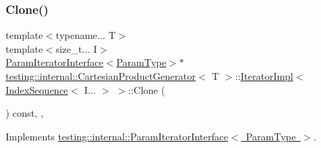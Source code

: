 \subsubsection{\texorpdfstring{Clone()}{Clone()}\hspace{0.1cm}{\footnotesize\ttfamily [1/2]}}
{\footnotesize\ttfamily template$<$typename... T$>$ \\
template$<$size\+\_\+t... I$>$ \\
\mbox{\hyperlink{classtesting_1_1internal_1_1_param_iterator_interface}{Param\+Iterator\+Interface}}$<$\mbox{\hyperlink{classtesting_1_1internal_1_1_cartesian_product_generator_af27131157a9347f0c82420ca081ee7dd}{Param\+Type}}$>$$\ast$ \mbox{\hyperlink{classtesting_1_1internal_1_1_cartesian_product_generator}{testing\+::internal\+::\+Cartesian\+Product\+Generator}}$<$ T $>$\+::\mbox{\hyperlink{classtesting_1_1internal_1_1_cartesian_product_generator_1_1_iterator_impl}{Iterator\+Impl}}$<$ \mbox{\hyperlink{structtesting_1_1internal_1_1_index_sequence}{Index\+Sequence}}$<$ I... $>$ $>$\+::Clone (\begin{DoxyParamCaption}{ }\end{DoxyParamCaption}) const\hspace{0.3cm}{\ttfamily [inline]}, {\ttfamily [override]}, {\ttfamily [virtual]}}



Implements \mbox{\hyperlink{classtesting_1_1internal_1_1_param_iterator_interface_a4998c23e27e2943d97546011aa35db80}{testing\+::internal\+::\+Param\+Iterator\+Interface$<$ Param\+Type $>$}}.

\mbox{\label{classtesting_1_1internal_1_1_cartesian_product_generator_1_1_iterator_impl_3_01_index_sequence_3_01_i_8_8_8_01_4_01_4_a0b434e09b32dfd6b444085cf95dc22ab}} 
